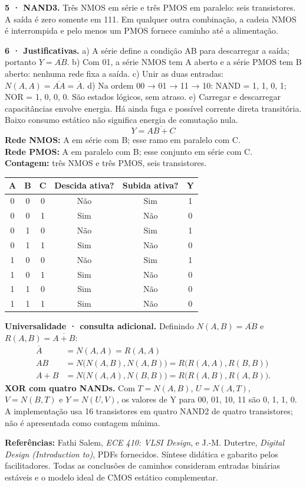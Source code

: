 \documentclass[11pt,a4paper]{article}
\begin{document}
\textbf{5 · NAND3.} Três NMOS em série e três PMOS em paralelo: seis transistores. A saída é zero somente em 111. Em qualquer outra combinação, a cadeia NMOS é interrompida e pelo menos um PMOS fornece caminho até a alimentação.

\textbf{6 · Justificativas.} a) A série define a condição AB para descarregar a saída; portanto $Y=\overline{AB}$. b) Com 01, a série NMOS tem A aberto e a série PMOS tem B aberto: nenhuma rede fixa a saída. c) Unir as duas entradas: $N(A,A)=\overline{AA}=\overline A$. d) Na ordem 00 → 01 → 11 → 10: NAND = 1, 1, 0, 1; NOR = 1, 0, 0, 0. São estados lógicos, sem atraso. e) Carregar e descarregar capacitâncias envolve energia. Há ainda fuga e possível corrente direta transitória. Baixo consumo estático não significa energia de comutação nula.
\newpage
{}
\[Y=\overline{AB+C}\]
\textbf{Rede NMOS:} A em série com B; esse ramo em paralelo com C.\\
\textbf{Rede PMOS:} A em paralelo com B; esse conjunto em série com C.\\
\textbf{Contagem:} três NMOS e três PMOS, seis transistores.

\begin{center}\begin{tabular}{cccccc}\toprule A & B & C & Descida ativa? & Subida ativa? & Y\\\midrule
0&0&0&Não&Sim&1\\0&0&1&Sim&Não&0\\0&1&0&Não&Sim&1\\0&1&1&Sim&Não&0\\
1&0&0&Não&Sim&1\\1&0&1&Sim&Não&0\\1&1&0&Sim&Não&0\\1&1&1&Sim&Não&0\\\bottomrule\end{tabular}\end{center}
\textbf{Universalidade · consulta adicional.} Definindo $N(A,B)=\overline{AB}$ e $R(A,B)=\overline{A+B}$:
\begin{align*}
\overline A&=N(A,A)=R(A,A)\\
AB&=N\bigl(N(A,B),N(A,B)\bigr)=R\bigl(R(A,A),R(B,B)\bigr)\\
A+B&=N\bigl(N(A,A),N(B,B)\bigr)=R\bigl(R(A,B),R(A,B)\bigr).
\end{align*}
\textbf{XOR com quatro NANDs.} Com $T=N(A,B)$, $U=N(A,T)$, $V=N(B,T)$ e $Y=N(U,V)$, os valores de Y para 00, 01, 10, 11 são 0, 1, 1, 0. A implementação usa 16 transistores em quatro NAND2 de quatro transistores; não é apresentada como contagem mínima.

\small\textbf{Referências:} Fathi Salem, \textit{ECE 410: VLSI Design}, e J.-M. Dutertre, \textit{Digital Design (Introduction to)}, PDFs fornecidos. Síntese didática e gabarito pelos facilitadores. Todas as conclusões de caminhos consideram entradas binárias estáveis e o modelo ideal de CMOS estático complementar.
\end{document}
